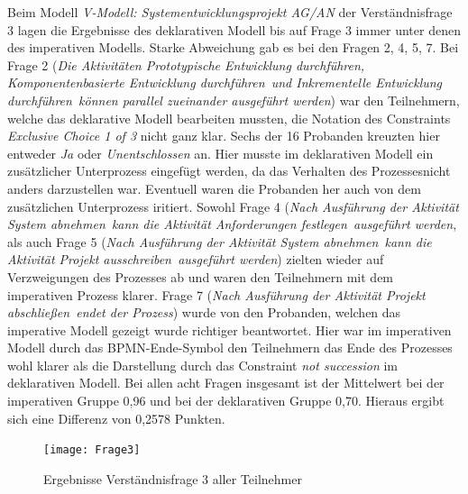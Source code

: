 Beim Modell \textit{V-Modell: Systementwicklungsprojekt AG/AN} der Verständnisfrage 3 lagen die Ergebnisse des deklarativen Modell bis auf Frage 3 immer unter denen des imperativen Modells. Starke Abweichung gab es bei den Fragen 2, 4, 5, 7. \newline
Bei Frage 2 (\textit{Die Aktivitäten \grqq Prototypische Entwicklung durchführen\grqq, \grqq Komponentenbasierte Entwicklung durchführen\grqq \ und \grqq Inkrementelle Entwicklung durchführen\grqq \ können parallel zueinander ausgeführt werden}) war den Teilnehmern, welche das deklarative Modell bearbeiten mussten, die Notation des Constraints \textit {Exclusive Choice 1 of 3} nicht ganz klar. Sechs der 16 Probanden kreuzten hier entweder \textit{Ja} oder \textit{Unentschlossen} an. Hier musste im deklarativen Modell ein zusätzlicher Unterprozess eingefügt werden, da das Verhalten des Prozessesnicht anders darzustellen war. Eventuell waren die Probanden her auch von dem zusätzlichen Unterprozess iritiert.\newline
Sowohl Frage 4 (\textit{Nach Ausführung der Aktivität \grqq System abnehmen\grqq \ kann die Aktivität \grqq Anforderungen festlegen\grqq \ ausgeführt werden}, als auch Frage 5 (\textit{Nach Ausführung der Aktivität \grqq System abnehmen\grqq \ kann die Aktivität \grqq Projekt ausschreiben\grqq \ ausgeführt werden}) zielten wieder auf Verzweigungen des Prozesses ab und waren den Teilnehmern mit dem imperativen Prozess klarer. \newline
Frage 7 (\textit{Nach Ausführung der Aktivität \grqq Projekt abschließen\grqq \ endet der Prozess}) wurde von den Probanden, welchen das imperative Modell gezeigt wurde richtiger beantwortet. Hier war im imperativen Modell durch das BPMN-Ende-Symbol den Teilnehmern das Ende des Prozesses wohl klarer als die Darstellung durch das Constraint \textit{not succession} im deklarativen Modell.\newline
Bei allen acht Fragen insgesamt ist der Mittelwert bei der imperativen Gruppe 0,96 und bei der deklarativen Gruppe 0,70. Hieraus ergibt sich eine Differenz von 0,2578 Punkten. \newline


\begin{figure}[htp]
\begin{center}
  \texttt{[image: Frage3]} %
  \caption{Ergebnisse Verständnisfrage 3 aller Teilnehmer}
  \label{fig:Frage3}
\end{center}
\end{figure}

